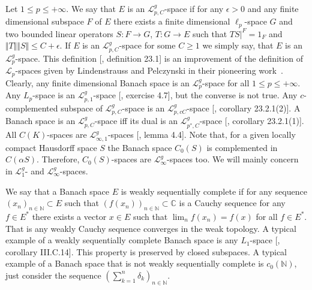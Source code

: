 Let $1\leq p\leq +\infty$. We say that $E$ is an $\mathscr{L}_{p,C}^g$-space if
for any $\epsilon>0$ and any finite dimensional subspace $F$ of $E$ there exists
a finite dimensional $\ell_p$-space $G$ and two bounded linear operators 
$S:F\to G$, $T:G\to E$ such that $TS|^F=1_F$ and 
$\Vert T\Vert\Vert S\Vert\leq C+\epsilon$. 
If $E$ is an $\mathscr{L}_{p,C}^g$-space for some $C\geq 1$ we
simply say, that $E$ is an $\mathscr{L}_p^g$-space. This definition
[\cite{DefFloTensNorOpId}, definition 23.1] is an improvement of the definition
of $\mathscr{L}_p$-spaces given by Lindenstrauss and Pelczynski in their
pioneering work~\cite{LinPelAbsSumOpInLpSpAndApp}. Clearly, any finite
dimensional Banach space is an $\mathscr{L}_p^g$-space for 
all $1\leq p\leq +\infty$. Any $L_p$-space is an $\mathscr{L}_{p,1}^g$-space
[\cite{DefFloTensNorOpId}, exercise 4.7], but the converse is not true. Any
$c$-complemented subspace of $\mathscr{L}_{p,C}^g$-space is an
$\mathscr{L}_{p,cC}^g$-space [\cite{DefFloTensNorOpId}, corollary 23.2.1(2)]. A
Banach space is an $\mathscr{L}_{p,C}^g$-space iff its dual is an
$\mathscr{L}_{p^*,C}^g$-space [\cite{DefFloTensNorOpId}, corollary 23.2.1(1)].
All $C(K)$-spaces are $\mathscr{L}_{\infty, 1}^g$-spaces
[\cite{DefFloTensNorOpId}, lemma 4.4]. Note that, for a given locally compact
Hausdorff space $S$ the Banach space $C_0(S)$ is complemented in $C(\alpha S)$.
Therefore, $C_0(S)$-spaces are $\mathscr{L}_\infty^g$-spaces too. We will mainly
concern in $\mathscr{L}_1^g$- and $\mathscr{L}_\infty^g$-spaces.

We say that a Banach space $E$ is weakly sequentially complete if for any
sequence ${(x_n)}_{n\in\mathbb{N}}\subset E$ such that
${(f(x_n))}_{n\in\mathbb{N}}\subset\mathbb{C}$ is a Cauchy sequence for 
any $f\in E^*$ there exists a vector $x\in E$ 
such that $\lim_n f(x_n)=f(x)$ for all $f\in E^*$. That is any weakly 
Cauchy sequence converges in the weak topology. A typical example of a weakly 
sequentially complete Banach space is any $L_1$-space
[\cite{WojBanSpForAnalysts}, corollary III.C.14]. This property is preserved by
closed subspaces. A typical example of a Banach space that is not weakly
sequentially complete is $c_0(\mathbb{N})$, just consider the sequence
${(\sum_{k=1}^n \delta_k)}_{n\in\mathbb{N}}$.

